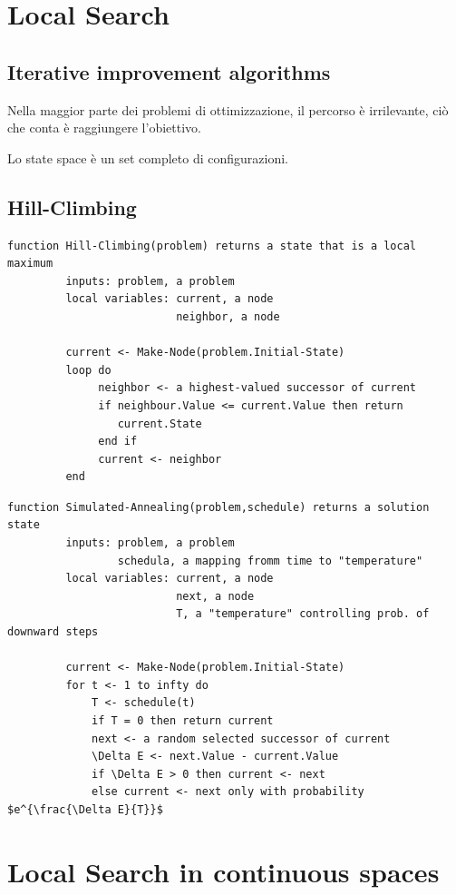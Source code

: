 \documentclass[12pt, a4paper]{article}
\begin{document}
\section{Local Search}
\subsection{Iterative improvement algorithms}
Nella maggior parte dei problemi di ottimizzazione, il percorso è irrilevante, ciò che conta è raggiungere l'obiettivo.

Lo state space è un set completo di configurazioni.

\subsection{Hill-Climbing}
\begin{lstlisting}
function Hill-Climbing(problem) returns a state that is a local maximum
         inputs: problem, a problem
         local variables: current, a node
                          neighbor, a node

         current <- Make-Node(problem.Initial-State)
         loop do
              neighbor <- a highest-valued successor of current
              if neighbour.Value <= current.Value then return
                 current.State
              end if
              current <- neighbor
         end
\end{lstlisting}

\begin{lstlisting}
function Simulated-Annealing(problem,schedule) returns a solution state
         inputs: problem, a problem
                 schedula, a mapping fromm time to "temperature"
         local variables: current, a node
                          next, a node
                          T, a "temperature" controlling prob. of downward steps

         current <- Make-Node(problem.Initial-State)
         for t <- 1 to infty do
             T <- schedule(t)
             if T = 0 then return current
             next <- a random selected successor of current
             \Delta E <- next.Value - current.Value
             if \Delta E > 0 then current <- next
             else current <- next only with probability $e^{\frac{\Delta E}{T}}$
\end{lstlisting}

\section{Local Search in continuous spaces}
\end{document}
